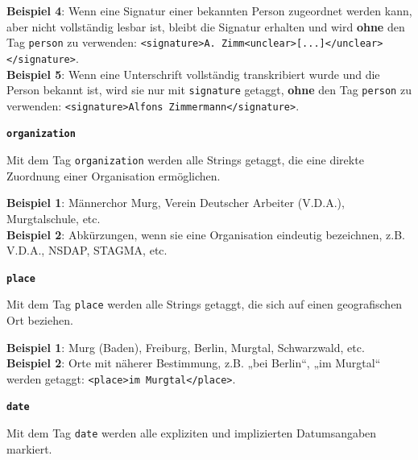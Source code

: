 \documentclass[12pt, a4paper, ngerman, bidi=default]{article}
\begin{document}
\begin{description}
    \textbf{ Beispiel 4}: Wenn eine Signatur einer bekannten Person zugeordnet werden kann, aber nicht vollständig lesbar ist, bleibt die Signatur erhalten und wird \textbf{ohne} den Tag \texttt{\colorbox{person}{person}} zu verwenden:  
    \texttt{\textless signature\textgreater A. Zimm\textless unclear\textgreater [...]\textless /unclear\textgreater\textless /signature\textgreater}. \\  
    
    \textbf{ Beispiel 5}: Wenn eine Unterschrift vollständig transkribiert wurde und die Person bekannt ist, wird sie nur mit \texttt{\colorbox{signature}{signature}} getaggt, \textbf{ohne} den Tag \texttt{\colorbox{person}{person}} zu verwenden:  
    \texttt{\textless signature\textgreater Alfons Zimmermann\textless /signature\textgreater}. \\  
    
    \item \textbf{\colorbox{organization}{\texttt{organization}}}
        
    Mit dem Tag \texttt{\colorbox{organization}{organization}} werden alle Strings getaggt, die eine direkte Zuordnung einer Organisation ermöglichen.  
    
    \noindent \textbf{ Beispiel 1}: Männerchor Murg, Verein Deutscher Arbeiter (V.D.A.), Murgtalschule, etc.\\
    \textbf{ Beispiel 2}: Abkürzungen, wenn sie eine Organisation eindeutig bezeichnen, z.B. V.D.A., NSDAP, STAGMA, etc.\\
    
    \item \textbf{\colorbox{place}{\texttt{place}}}
        
    Mit dem Tag \texttt{\colorbox{place}{place}} werden alle Strings getaggt, die sich auf einen geografischen Ort beziehen.  
    
    \noindent \textbf{ Beispiel 1}: Murg (Baden), Freiburg, Berlin, Murgtal, Schwarzwald, etc.\\
    \textbf{ Beispiel 2}: Orte mit näherer Bestimmung, z.B. „bei Berlin“, „im Murgtal“ werden getaggt:  
    \texttt{\textless place\textgreater im Murgtal\textless /place\textgreater}. \\
    
    \item \textbf{\colorbox{date}{\texttt{date}}}
        
    Mit dem Tag \texttt{\colorbox{date}{date}} werden alle expliziten und implizierten Datumsangaben markiert.  
    

\end{description}
\end{document}
